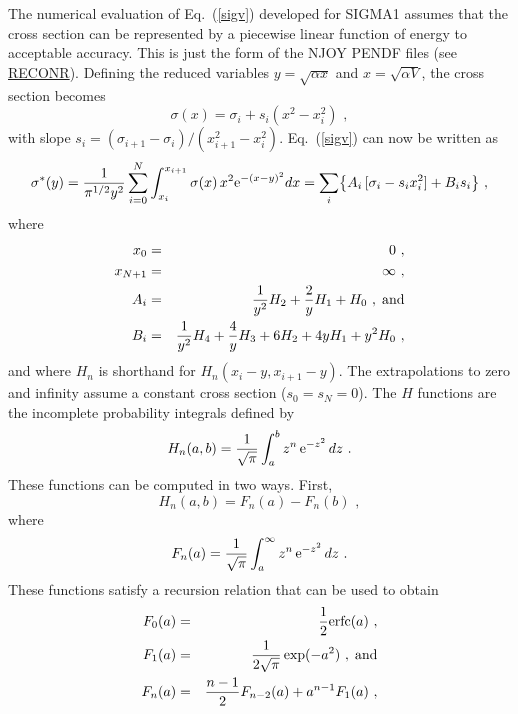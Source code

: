 The numerical evaluation of Eq.~(\ref{sigv}) developed for SIGMA1
assumes that the cross section can be represented by a piecewise
linear function of energy to acceptable accuracy.  This is just
the form of the NJOY PENDF files (see
\hyperlink{sRECONRhy}{RECONR}).  Defining the
reduced variables $y=\sqrt{\alpha x}$ and $x=\sqrt{\alpha V}$,
the cross section becomes
\begin{equation}
  \sigma (x)=\sigma_i + s_i (x^2-x_i^2 )\,\,,
\label{sigmax}
\end{equation}
with slope $s_i=(\sigma_{i+1}-\sigma_i)/(x_{i+1}^2-x_i^2 )$.
Eq.~(\ref{sigv}) can now be written as
\begin{equation}
  \sigma^*(y)={{1} \over{\pi^{1/2}y^2}}
    \sum_{i=0}^N \int_{x_i}^{x_{i+1}}
    \sigma (x)\,x^2 {\rm e}^{-(x-y)^2}dx
    = \sum_i \bigl\lbrace A_i\,[\sigma_i-s_i x_i^2]+
    B_i s_i \bigr\rbrace \,\,,
\label{sigy}
\end{equation}
where
\begin{eqnarray}
  x_0&=&0\,\,,\nonumber\\
  x_{N+1}&=&\infty\,\,,\nonumber\\
  A_i&=&{1\over y^2}H_2+{2\over y}H_1+H_0\,\,,\;\hbox{and}\nonumber\\
  B_i&=&{1\over y^2}H_4+{4\over y}H_3+6H_2+4yH_1+y^2 H_0\nonumber \,\,,
\end{eqnarray}
and where $H_n$ is shorthand for $H_n(x_i{-}y,x_{i+1}{-}y)$.  The
extrapolations to zero and infinity assume a constant cross section
($s_0{=}s_N{=}0$).  The $H$ functions are the incomplete
probability integrals
 defined by
\begin{equation}
  H_n(a,b)={1\over \sqrt{\pi}} \int_a^b
    z^n\,{\rm e}^{-z^2}\,dz\,\,.
\label{fn}
\end{equation}
These functions can be computed in two ways.  First,
\begin{equation}
  H_n(a,b)=F_n(a)-F_n(b)\,\,,
\label{diffs}
\end{equation}
where
\begin{equation}
  F_n(a)={1\over \sqrt{\pi}}\int_a^\infty z^n\,{\rm e}^{-z^2}\,dz\,\,.
\end{equation}
These functions satisfy a recursion relation that can be used
to obtain
\begin{eqnarray}
  F_0(a)&=&{1\over 2} {\rm erfc}(a)\,\,,\\
  F_1(a)&=&{1\over {2\sqrt{\pi}}} \exp(-a^2)\,\,,\;\hbox{and}\\
  F_n(a)&=&{{n-1} \over 2}F_{n-2}(a)+a^{n-1}F_1(a)\,\,,
\label{recur}
\end{eqnarray}
